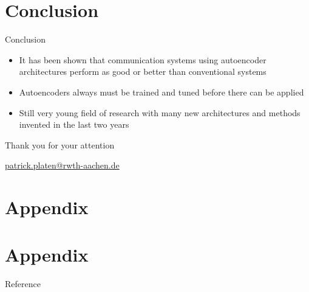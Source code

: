 \documentclass[xcolor=table,mathserif,9pt]{beamer}    %
\newcommand{\backupbegin}{
   \newcounter{finalframe}
   \setcounter{finalframe}{\value{framenumber}}
}
\newcommand{\backupend}{
   \setcounter{framenumber}{\value{finalframe}}
}
\newcommand{\stoptocwriting}{%
  \addtocontents{toc}{\protect\setcounter{tocdepth}{-5}}}
\newcommand{\resumetocwriting}{%
  \addtocontents{toc}{\protect\setcounter{tocdepth}{2}}}
\begin{document}
\section{Conclusion}
\begin{frame}{Conclusion}

\begin{itemize}
	\item It has been shown that communication systems using autoencoder architectures perform as good or better than conventional systems
	\item Autoencoders always must be trained and tuned before there can be applied 
	\item Still very young field of research with many new architectures and methods invented in the last two years
\end{itemize}

\end{frame}

\begin{frame}[label=finalSlide]
  \label{LastPage}%
  \begin{center}
    \vfill
    {\Large
    \textcolor{i6bluedark}{Thank you for your attention}
    }
    \vfill
    {\insertauthor}

    \vspace{10mm}
    \url{patrick.platen@rwth-aachen.de}
  \end{center}
\end{frame}

\nocite{*}

\stoptocwriting
\section{Appendix}
\resumetocwriting



\section*{Appendix}




\begin{frame}[allowframebreaks]
  \centerline{Reference}
 
 
\end{frame}

\end{document}
